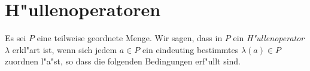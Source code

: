 \documentclass{amsart}
\begin{document}
\section{H"ullenoperatoren}
Es sei $P$ eine teilweise geordnete Menge. Wir
sagen, dass in $P$ ein \emph{H"ullenoperator}
$\lambda$ erkl"art ist, wenn sich jedem $a \in  P$
ein eindeuting bestimmtes $\lambda(a) \in P$
zuordnen l"a"st, so  dass die folgenden
Bedingungen erf"ullt sind.
\end{document}
